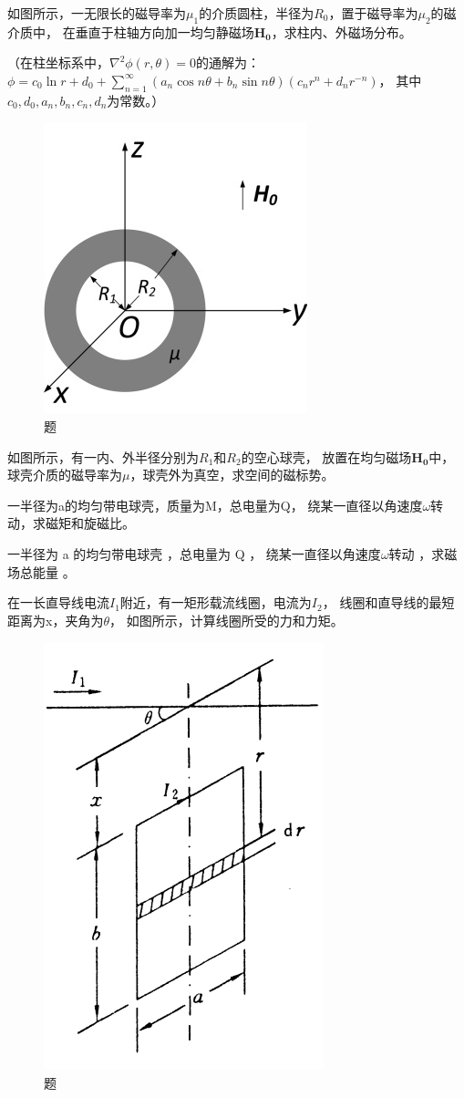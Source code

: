 \begin{question}
如图所示，一无限长的磁导率为$\mu_1$的介质圆柱，半径为$R_0$，置于磁导率为$\mu_2$的磁介质中，
在垂直于柱轴方向加一均匀静磁场$\mathbf{H_0}$，求柱内、外磁场分布。

\noindent（在柱坐标系中，$\nabla^2 \phi(r,\theta)=0$的通解为： 
$\phi=c_0 \ln r+d_0+\sum_{n=1}^{\infty}(a_n \cos n\theta+b_n \sin n\theta)(c_nr^n+d_nr^{-n})$，
其中$c_0,d_0,a_n,b_n,c_n,d_n$为常数。）
\begin{figure}[ht]
	\centering
	\includegraphics[height=3 cm]{images/q3_2.jpg}
	\caption{题\thequestion}
\end{figure}
\end{question}

\begin{question}
如图所示，有一内、外半径分别为$R_1$和$R_2$的空心球壳，
放置在均匀磁场$\mathbf{H_0}$中，
球壳介质的磁导率为$\mu$，球壳外为真空，求空间的磁标势。
\end{question}


\begin{question}
	一半径为a的均匀带电球壳，质量为M，总电量为Q，
	绕某一直径以角速度$\omega$转动，求磁矩和旋磁比。
\end{question}

\begin{question}
一半径为 a 的均匀带电球壳 ，总电量为 Q ，
绕某一直径以角速度$\omega$转动 ，求磁场总能量 。
\end{question}

\begin{question}
在一长直导线电流$I_1$附近，有一矩形载流线圈，电流为$I_2$，
线圈和直导线的最短距离为x，夹角为$\theta$，
如图所示，计算线圈所受的力和力矩。
\begin{figure}[ht]
	\centering
	\includegraphics[height=3 cm]{images/q3_3.png}
	\caption{题\thequestion}
\end{figure}
\end{question}